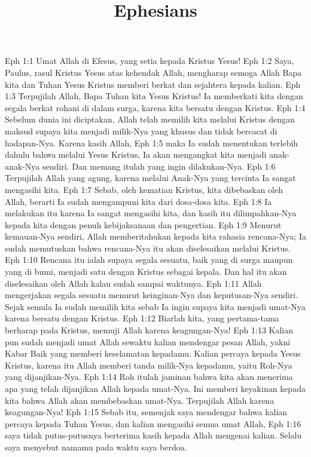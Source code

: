 

\title{Ephesians}

Eph 1:1  Umat Allah di Efesus, yang setia kepada Kristus Yesus!
Eph 1:2  Saya, Paulus, rasul Kristus Yesus atas kehendak Allah, mengharap semoga Allah Bapa kita dan Tuhan Yesus Kristus memberi berkat dan sejahtera kepada kalian.
Eph 1:3  Terpujilah Allah, Bapa Tuhan kita Yesus Kristus! Ia memberkati kita dengan segala berkat rohani di dalam surga, karena kita bersatu dengan Kristus.
Eph 1:4  Sebelum dunia ini diciptakan, Allah telah memilih kita melalui Kristus dengan maksud supaya kita menjadi milik-Nya yang khusus dan tidak bercacat di hadapan-Nya. Karena kasih Allah,
Eph 1:5  maka Ia sudah menentukan terlebih dahulu bahwa melalui Yesus Kristus, Ia akan mengangkat kita menjadi anak-anak-Nya sendiri. Dan memang itulah yang ingin dilakukan-Nya.
Eph 1:6  Terpujilah Allah yang agung, karena melalui Anak-Nya yang tercinta Ia sangat mengasihi kita.
Eph 1:7  Sebab, oleh kematian Kristus, kita dibebaskan oleh Allah, berarti Ia sudah mengampuni kita dari dosa-dosa kita.
Eph 1:8  Ia melakukan itu karena Ia sangat mengasihi kita, dan kasih itu dilimpahkan-Nya kepada kita dengan penuh kebijaksanaan dan pengertian.
Eph 1:9  Menurut kemauan-Nya sendiri, Allah memberitahukan kepada kita rahasia rencana-Nya; Ia sudah memutuskan bahwa rencana-Nya itu akan diselesaikan melalui Kristus.
Eph 1:10  Rencana itu ialah supaya segala sesuatu, baik yang di surga maupun yang di bumi, menjadi satu dengan Kristus sebagai kepala. Dan hal itu akan diselesaikan oleh Allah kalau sudah sampai waktunya.
Eph 1:11  Allah mengerjakan segala sesuatu menurut keinginan-Nya dan keputusan-Nya sendiri. Sejak semula Ia sudah memilih kita sebab Ia ingin supaya kita menjadi umat-Nya karena bersatu dengan Kristus.
Eph 1:12  Biarlah kita, yang pertama-tama berharap pada Kristus, memuji Allah karena keagungan-Nya!
Eph 1:13  Kalian pun sudah menjadi umat Allah sewaktu kalian mendengar pesan Allah, yakni Kabar Baik yang memberi keselamatan kepadamu. Kalian percaya kepada Yesus Kristus, karena itu Allah memberi tanda milik-Nya kepadamu, yaitu Roh-Nya yang dijanjikan-Nya.
Eph 1:14  Roh itulah jaminan bahwa kita akan menerima apa yang telah dijanjikan Allah kepada umat-Nya. Ini memberi keyakinan kepada kita bahwa Allah akan membebaskan umat-Nya. Terpujilah Allah karena keagungan-Nya!
Eph 1:15  Sebab itu, semenjak saya mendengar bahwa kalian percaya kepada Tuhan Yesus, dan kalian mengasihi semua umat Allah,
Eph 1:16  saya tidak putus-putusnya berterima kasih kepada Allah mengenai kalian. Selalu saya menyebut namamu pada waktu saya berdoa.
